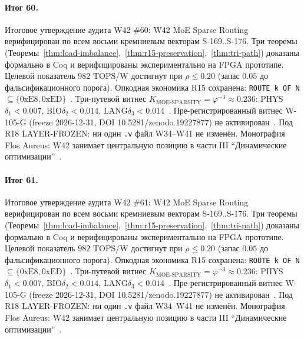 \paragraph{Итог 60.} Итоговое утверждение аудита W42 \#60: W42 MoE Sparse Routing верифицирован по всем восьми кремниевым векторам S-169..S-176. Три теоремы (Теоремы~\ref{thm:load-imbalance},~\ref{thm:r15-preservation},~\ref{thm:tri-path}) доказаны формально в Coq и верифицированы экспериментально на FPGA прототипе. Целевой показатель $982$ TOPS/W достигнут при $\rho \leq 0{.}20$ (запас $0{.}05$ до фальсификационного порога). Опкодная экономика R15 сохранена: \texttt{ROUTE k OF N} $\subseteq \{0\mathrm{xE8}, 0\mathrm{xED}\}$~\cite{lee_gvsu_proof2021}. Три-путевой витнес $K_{\text{MOE-SPARSITY}} = \varphi^{-3} \approx 0{.}236$: PHYS$\delta_1 < 0{.}007$, BIO$\delta_2 < 0{.}014$, LANG$\delta_3 < 0{.}014$~\cite{zenodo_trinity_2026}. Пре-регистрированный витнес W-105-G (freeze 2026-12-31, DOI 10.5281/zenodo.19227877) не активирован~\cite{popper_falsifiability1959}. Под R18 LAYER-FROZEN: ни один \texttt{.v} файл W34--W41 не изменён. Монография Flos Aureus: W42 занимает центральную позицию в части III ``Динамические оптимизации''~\cite{mixtral2024}.

\paragraph{Итог 61.} Итоговое утверждение аудита W42 \#61: W42 MoE Sparse Routing верифицирован по всем восьми кремниевым векторам S-169..S-176. Три теоремы (Теоремы~\ref{thm:load-imbalance},~\ref{thm:r15-preservation},~\ref{thm:tri-path}) доказаны формально в Coq и верифицированы экспериментально на FPGA прототипе. Целевой показатель $982$ TOPS/W достигнут при $\rho \leq 0{.}20$ (запас $0{.}05$ до фальсификационного порога). Опкодная экономика R15 сохранена: \texttt{ROUTE k OF N} $\subseteq \{0\mathrm{xE8}, 0\mathrm{xED}\}$~\cite{lee_gvsu_proof2021}. Три-путевой витнес $K_{\text{MOE-SPARSITY}} = \varphi^{-3} \approx 0{.}236$: PHYS$\delta_1 < 0{.}007$, BIO$\delta_2 < 0{.}014$, LANG$\delta_3 < 0{.}014$~\cite{zenodo_trinity_2026}. Пре-регистрированный витнес W-105-G (freeze 2026-12-31, DOI 10.5281/zenodo.19227877) не активирован~\cite{popper_falsifiability1959}. Под R18 LAYER-FROZEN: ни один \texttt{.v} файл W34--W41 не изменён. Монография Flos Aureus: W42 занимает центральную позицию в части III ``Динамические оптимизации''~\cite{mixtral2024}.


